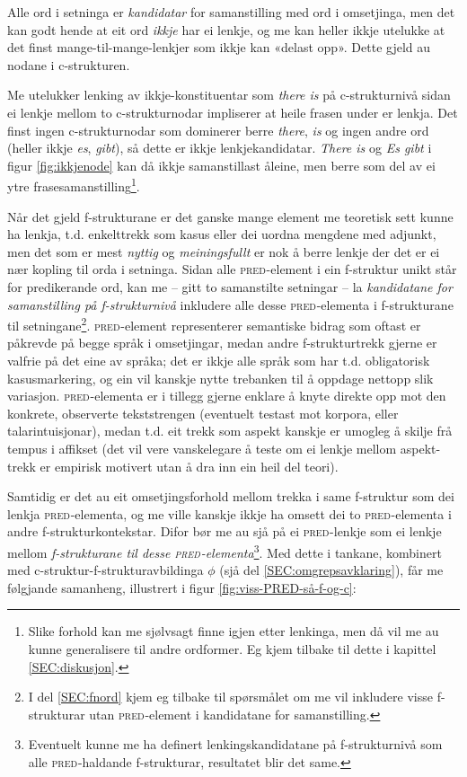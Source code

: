 \documentclass[12pt,a4paper,oneside,draft]{report}
\newcommand{\F}[2]{\textsc{#1}\ensuremath{_{#2}}}
\newcommand{\PRED}{\F{pred}{}}
\begin{document}
Alle ord i setninga er \emph{kandidatar} for samanstilling med ord i
omsetjinga, men det kan godt hende at eit ord \emph{ikkje} har ei lenkje,
og me kan heller ikkje utelukke at det finst mange-til-mange-lenkjer
som ikkje kan «delast opp». Dette gjeld au nodane i c\hyp{}strukturen.

Me utelukker lenking av ikkje-konstituentar som \emph{there is} på
c\hyp{}strukturnivå sidan ei lenkje mellom to c\hyp{}strukturnodar impliserer at
heile frasen under er lenkja. Det finst ingen c\hyp{}strukturnodar som
dominerer berre \emph{there}, \emph{is} og ingen andre ord (heller ikkje \emph{es},
\emph{gibt}), så dette er ikkje lenkjekandidatar.  \emph{There is} og \emph{Es gibt}
i figur \ref{fig:ikkjenode} kan då ikkje samanstillast åleine, men
berre som del av ei ytre frasesamanstilling\footnote{Slike forhold kan me sjølvsagt finne igjen etter lenkinga,
        men då vil me au kunne generalisere til andre ordformer. Eg
        kjem tilbake til dette i kapittel \ref{SEC:diskusjon}. }.

Når det gjeld f\hyp{}strukturane er det ganske mange element me teoretisk
sett kunne ha lenkja, t.d. enkelttrekk som kasus eller dei uordna
mengdene med adjunkt, men det som er mest \emph{nyttig} og \emph{meiningsfullt}
er nok å berre lenkje der det er ei nær kopling til orda i
setninga. Sidan alle \PRED{}-element i ein f\hyp{}struktur unikt står for
predikerande ord, kan me -- gitt to samanstilte setningar -- la
\emph{kandidatane for samanstilling på f\hyp{}strukturnivå} inkludere alle
desse \PRED{}-elementa i f\hyp{}strukturane til
setningane\footnote{I del \ref{SEC:fnord} kjem eg tilbake til spørsmålet om me vil
        inkludere visse f\hyp{}strukturar utan \PRED{}-element i kandidatane
        for samanstilling. }. \PRED{}-element representerer semantiske bidrag som
oftast er påkrevde på begge språk i omsetjingar, medan andre
f\hyp{}strukturtrekk gjerne er valfrie på det eine av språka; det er ikkje
alle språk som har t.d. obligatorisk kasusmarkering, og ein vil
kanskje nytte trebanken til å oppdage nettopp slik variasjon.
\PRED{}-elementa er i tillegg gjerne enklare å knyte direkte opp mot den
konkrete, observerte tekststrengen (eventuelt testast mot korpora,
eller talarintuisjonar), medan t.d. eit trekk som aspekt kanskje er
umogleg å skilje frå tempus i affikset (det vil vere vanskelegare å
teste om ei lenkje mellom aspekt-trekk er empirisk motivert utan å dra
inn ein heil del teori).

Samtidig er det au eit omsetjingsforhold mellom trekka i same
f\hyp{}struktur som dei lenkja \PRED{}-elementa, og me ville kanskje ikkje ha
omsett dei to \PRED{}-elementa i andre f\hyp{}strukturkontekstar. Difor bør me
au sjå på ei \PRED{}-lenkje som ei lenkje mellom \emph{f\hyp{}strukturane til
desse \PRED{}-elementa}\footnote{Eventuelt kunne me ha definert lenkingskandidatane på
       f\hyp{}strukturnivå som alle \PRED{}-haldande f\hyp{}strukturar, resultatet
       blir det same. }.  Med dette i tankane, kombinert med
c\hyp{}struktur-f\hyp{}strukturavbildinga $\phi$ (sjå del
\ref{SEC:omgrepsavklaring}), får me følgjande samanheng, illustrert i
figur \ref{fig:viss-PRED-så-f-og-c}:
\end{document}
